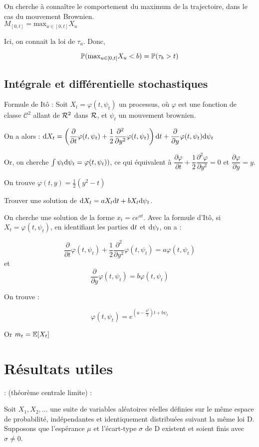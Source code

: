On cherche à connaître le comportement du maximum de la trajectoire, dans le cas du mouvement Brownien. \\
$M_{[0,t]} = \text{max}_{u \in [0,t]} X_u$

Ici, on connait la loi de $\tau_a$. Donc,

\[ \P(\text{max}_{u \in [0,t]} X_u < b) = \P(\tau_b > t) \]

\section{Intégrale et différentielle stochastiques}

Formule de Itô : Soit $X_t = \varphi(t,\psi_t)$ un processus, où $\varphi$ est une fonction de classe $\mathcal{C}^2$ allant de $\R^2$ dans $\R$, et $\psi_t$ un mouvement brownien.

On a alors :
$\ud X_t = \left(\dfrac{\partial }{\partial t}\varphi(t,\psi_t) + \dfrac{1}{2}\dfrac{\partial^2}{\partial y^2}\varphi(t,\psi_t)\right) \ud t + \dfrac{\partial}{\partial y}\varphi(t,\psi_t) \ud \psi_t $

Or, on cherche $\int \psi_t \ud \psi_t = \varphi(t,\psi_t))$, ce qui équivalent à $\dfrac{\partial \varphi}{\partial t} + \dfrac{1}{2}\dfrac{\partial^2 \varphi}{\partial y^2} = 0$ et $\dfrac{\partial \varphi}{\partial y} = y$.

On trouve $\varphi(t,y) = \frac{1}{2}(y^2-t)$

Trouver une solution de $\ud X_t = aX_t \ud t + b X_t \ud \psi_t$.

On cherche une solution de la forme $x_t = ce^{at}$. Avec la formule d'Itô, si $X_t = \varphi(t,\psi_t)$, en identifiant les parties $\ud t$ et $\ud \psi_t$, on a :

\[ \dfrac{\partial }{\partial t}\varphi(t,\psi_t) + \dfrac{1}{2}\dfrac{\partial^2}{\partial y^2}\varphi(t,\psi_t) = a\varphi(t,\psi_t) \]
et 
\[\dfrac{\partial}{\partial y}\varphi(t,\psi_t) = b\varphi(t,\psi_t) \]

On trouve :

\[ \varphi(t,\psi_t) = e^{(a-\frac{b^2}{2})t + b\psi_t} \]


Or $m_t = \E[X_t]$
\chapter{Résultats utiles}

\Th : (théorème centrale limite) : 

Soit $X_1, X_2,\ldots$ une suite de variables aléatoires réelles définies sur le même espace de probabilité, indépendantes et identiquement distribuées suivant la même loi D. Supposons que l'espérance $\mu$ et l'écart-type $\sigma$ de D existent et soient finis avec $\sigma \neq 0$.

